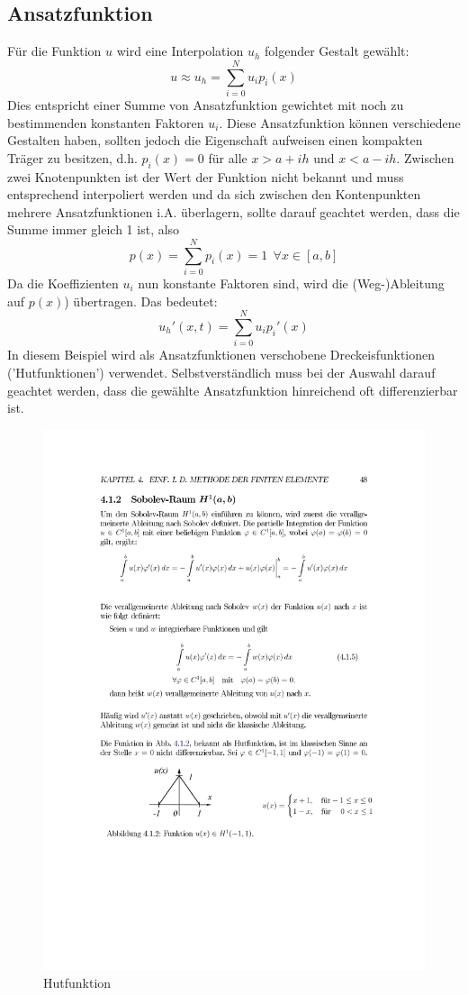 	\subsection{Ansatzfunktion}
	Für die Funktion $u$ wird eine Interpolation $u_h$ folgender Gestalt gewählt:
	\begin{equation}
	u \approx u_h = \sum_{i = 0}^{N} u_i  p_i(x)
	\end{equation}
	Dies entspricht einer Summe von Ansatzfunktion gewichtet mit noch zu bestimmenden konstanten Faktoren $u_i$. Diese Ansatzfunktion können verschiedene Gestalten haben, sollten jedoch die Eigenschaft aufweisen einen kompakten Träger zu besitzen, d.h. $p_i(x) = 0$ für alle $x > a+ih$ und $x < a-ih$. Zwischen zwei Knotenpunkten ist der Wert der Funktion nicht bekannt und muss entsprechend interpoliert werden und da sich zwischen den Kontenpunkten mehrere Ansatzfunktionen i.A. überlagern, sollte darauf geachtet werden, dass die Summe immer gleich 1 ist, also
	\begin{equation}
	p(x) = \sum_{i=0}^{N} p_i(x) = 1 ~~\forall x \in [a,b] 
	\end{equation} 
	Da die Koeffizienten $u_i$ nun konstante Faktoren sind, wird die (Weg-)Ableitung auf $p(x)$) übertragen. Das bedeutet:
	\begin{equation}
	u_h'(x,t) = \sum_{i = 0}^{N} u_i  p_i'(x)
	\end{equation}
	In diesem Beispiel wird als Ansatzfunktionen verschobene Dreckeisfunktionen ('Hutfunktionen') verwendet. Selbstverständlich muss bei der Auswahl darauf geachtet werden, dass die gewählte Ansatzfunktion hinreichend oft differenzierbar ist.

	\begin{figure}
		\centering
		\includegraphics[width=0.5\linewidth]{img/hut}
		\caption[Hutfunktion]{Hutfunktion}
		\label{fig:hut}
	\end{figure}


